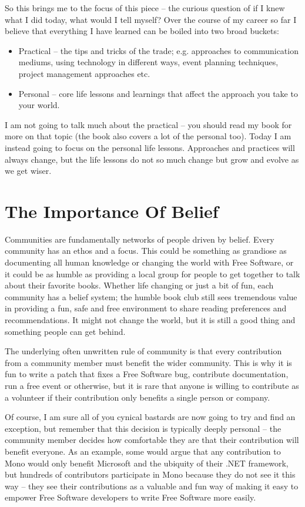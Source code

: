 So this brings me to the focus of this piece -- the curious question of if I knew what I did today, what would I tell myself? Over the course of my career so far I believe that everything I have learned can be boiled into two broad buckets:
\begin{itemize}
 \item Practical -- the tips and tricks of the trade; e.g. approaches to
communication mediums, using technology in different ways, event planning
techniques, project management approaches etc.
 \item Personal -- core life lessons and learnings that affect the approach you
take to your world.
\end{itemize}
I am not going to talk much about the practical -- you should read my
book for more on that topic (the book also covers a lot of the personal too).
Today I am instead going to focus on the personal life lessons. Approaches and
practices will always change, but the life lessons do not so much change but
grow and evolve as we get wiser.

\section*{The Importance Of Belief}

Communities are fundamentally networks of people driven by belief. Every
community has an ethos and a focus. This could be something as grandiose as
documenting all human knowledge or changing the world with Free Software, or it
could be as humble as providing a local group for people to get together to talk
about their favorite books. Whether life changing or just a bit of fun, each
community has a belief system; the humble book club still sees tremendous value
in providing a fun, safe and free environment to share reading preferences and
recommendations. It might not change the world, but it is still a good thing and
something people can get behind.

The underlying often unwritten rule of community is that every contribution from
a community member must benefit the wider community. This is why it is fun to
write a patch that fixes a Free Software bug, contribute documentation, run a
free event or otherwise, but it is rare that anyone is willing to contribute as
a volunteer if their contribution only benefits a single person or company.

Of course, I am sure all of you cynical bastards are now going to try and find
an exception, but remember that this decision is typically deeply personal --
the community member decides how comfortable they are that their contribution
will benefit everyone. As an example, some would argue that any contribution to
Mono would only benefit Microsoft and the ubiquity of their .NET framework, but
hundreds of contributors participate in Mono because they do not see it this way
-- they see their contributions as a valuable and fun way of making it easy to
empower Free Software developers to write Free Software more easily.

